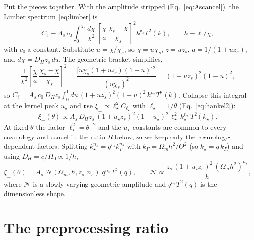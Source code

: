 \documentclass[11pt]{article}
\newcommand{\Om}{\Omega_m}
\newcommand{\As}{A_s}
\newcommand{\ns}{n_s}
\newcommand{\Dhub}{D_H}
\newcommand{\xipm}{\xi_\pm}
\begin{document}
Put the pieces together. With the amplitude stripped
(Eq.~\ref{eq:Ascancel}), the Limber spectrum~\eqref{eq:limber} is
\begin{equation}
  C_\ell = \As\,c_0\!\int_0^{\chi_s}\!\! \frac{d\chi}{\chi^2}\,
  \left[\frac{\chi}{a}\,\frac{\chi_s-\chi}{\chi_s}\right]^2
  k^{\ns}T^2(k), \qquad k=\ell/\chi,
\end{equation}
with $c_0$ a constant. Substitute $u=\chi/\chi_s$, so $\chi=u\chi_s$,
$z=u z_s$, $a=1/(1+u z_s)$, and $d\chi=\Dhub z_s\,du$. The geometric
bracket simplifies,
\begin{equation}
  \frac{1}{\chi^2}
  \left[\frac{\chi}{a}\,\frac{\chi_s-\chi}{\chi_s}\right]^2
  =\frac{\big[u\chi_s(1+u z_s)(1-u)\big]^2}{(u\chi_s)^2}
  =(1+u z_s)^2(1-u)^2,
\end{equation}
so $C_\ell=\As\,c_0\,\Dhub z_s\!\int_0^1\!du\,(1+u z_s)^2(1-u)^2\,
k^{\ns}T^2(k)$. Collapse this integral at the kernel peak $u_\star$
and use $\xipm\propto\ell_\star^2 C_{\ell_\star}$ with
$\ell_\star=1/\theta$ (Eq.~\ref{eq:hankel2}):
\begin{equation}
  \xipm(\theta)\propto \As\,
  \Dhub z_s\,(1+u_\star z_s)^2(1-u_\star)^2\,
  \ell_\star^2\,k_\star^{\ns}\,T^2(k_\star).
  \label{eq:xicollapse}
\end{equation}
At fixed $\theta$ the factor $\ell_\star^2=\theta^{-2}$ and the
$u_\star$ constants are common to every cosmology and cancel in the
ratio $R$ below, so we keep only the cosmology-dependent factors.
Splitting $k_\star^{\ns}=q^{\ns}k_\Gamma^{\ns}$ with
$k_\Gamma=\Om h^2/\Theta^2$ (so $k_\star=q\,k_\Gamma$) and using
$\Dhub=c/H_0\propto1/h$,
\begin{equation}
  \xipm(\theta)=\As\;\mathcal{N}(\Om,h,z_s,\ns)\;
                q^{\ns}\,T^2(q),
  \qquad
  \mathcal{N}\propto
  \frac{z_s\,(1+u_\star z_s)^2\,(\Om h^2)^{\ns}}{h},
  \label{eq:xifull}
\end{equation}
where $\mathcal{N}$ is a slowly varying geometric amplitude and
$q^{\ns}T^2(q)$ is the dimensionless shape.

\section{The preprocessing ratio}
\end{document}
